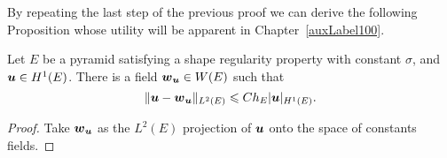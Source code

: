 By repeating the last step of the previous proof we can derive the following Proposition
whose utility will be apparent in Chapter~\ref{auxLabel100}.
\begin{proposition}\label{propupi}
Let $E$ be a pyramid satisfying a shape regularity property with constant 
$\sigma$, and $\boldsymbol{u}\in H^1(E)$. 
There is a field $\boldsymbol{w}_{\boldsymbol{u}}\in W(E)$ such that
\[
  \|\boldsymbol{u}-\boldsymbol{w}_{\boldsymbol{u}}\|_{L^2(E)} \leqslant C h_E |\boldsymbol{u}|_{H^1(E)}.
\]
\end{proposition}
\begin{proof}
Take $\boldsymbol{w}_{\boldsymbol{u}}$
as the $L^2(E)$ projection of $\boldsymbol{u}$ onto the space of constants fields.
\end{proof}
